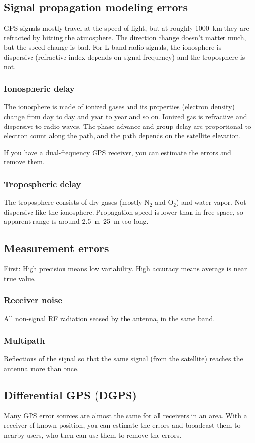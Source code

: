 \subsection{Signal propagation modeling errors}

GPS signals mostly travel at the speed of light, but at roughly \SI{1000}{km} they are refracted by hitting the atmosphere. The direction change doesn't matter much, but the speed change is bad. For L-band radio signals, the ionosphere is dispersive (refractive index depends on signal frequency) and the troposphere is not.

\subsubsection{Ionospheric delay}
The ionosphere is made of ionized gases and its properties (electron density) change from day to day and year to year and so on. Ionized gas is refractive and dispersive to radio waves. The phase advance and group delay are proportional to electron count along the path, and the path depends on the satellite elevation.

If you have a dual-frequency GPS receiver, you can estimate the errors and remove them.

\subsubsection{Tropospheric delay}
The troposphere consists of dry gases (mostly $\text{N}_2$ and $\text{O}_2$) and water vapor. Not dispersive like the ionosphere. Propagation speed is lower than in free space, so apparent range is around \SIrange{2.5}{25}{\meter} too long.

\subsection{Measurement errors}
First: High precision means low variability. High accuracy means average is near true value.

\subsubsection{Receiver noise}
All non-signal RF radiation sensed by the antenna, in the same band.

\subsubsection{Multipath}
Reflections of the signal so that the same signal (from the satellite) reaches the antenna more than once.

\subsection{Differential GPS (DGPS)}
Many GPS error sources are almost the same for all receivers in an area. With a receiver of known position, you can estimate the errors and broadcast them to nearby users, who then can use them to remove the errors.
